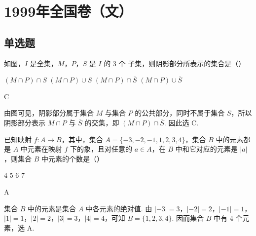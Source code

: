 \documentclass[UTF8,a4paper,oneside,11pt]{ctexbook}
\begin{document}
\mainmatter

\chapter{1999年全国卷（文）}
\section{单选题}

\begin{problem}
如图，\(I\) 是全集，\(M\)，\(P\)，\(S\) 是 \(I\) 的 \(3\text{ 个}\) 子集，则阴影部分所表示的集合是（\quad）


\choices
    {\((M\cap P)\cap S\)}
    {\((M\cap P)\cup S\)}
    {\((M\cap P)\cap \overline{S}\)}
    {\((M\cap P)\cup \overline{S}\)}
\end{problem}

\begin{answer}
C
\end{answer}

\begin{solution}
由图可见，阴影部分属于集合 \(M\) 与集合 \(P\) 的公共部分，同时不属于集合 \(S\)，所以阴影部分表示
\(M\cap P\) 与 \(\overline{S}\) 的交集，即 \((M\cap P)\cap\overline{S}\). 因此选 C.
\end{solution}

\begin{problem}
已知映射 \(f: A \to B \)，其中，集合 \(A = \{-3, -2, -1, 1, 2, 3, 4\} \)，集合 \(B\) 中的元素都是 \(A\) 中元素在映射 \(f \) 下的象，且对任意的 \(a \in A \)，在 \(B\) 中和它对应的元素是 \(|a| \)，则集合 \(B\) 中元素的个数是（\quad）

\choices
    {\(4\)}
    {\(5\)}
    {\(6\)}
    {\(7\)}
\end{problem}

\begin{answer}
A
\end{answer}

\begin{solution}
集合 \(B\) 中的元素是集合 \(A\) 中各元素的绝对值. 由
\(\lvert-3\rvert=3\)，\(\lvert-2\rvert=2\)，\(\lvert-1\rvert=1\)，\(\lvert1\rvert=1\)，\(\lvert2\rvert=2\)，\(\lvert3\rvert=3\)，\(\lvert4\rvert=4\)，可知
\(B=\{1,2,3,4\}\). 因而集合 \(B\) 中有 \(4\) 个元素，选 A.
\end{solution}
\end{document}
